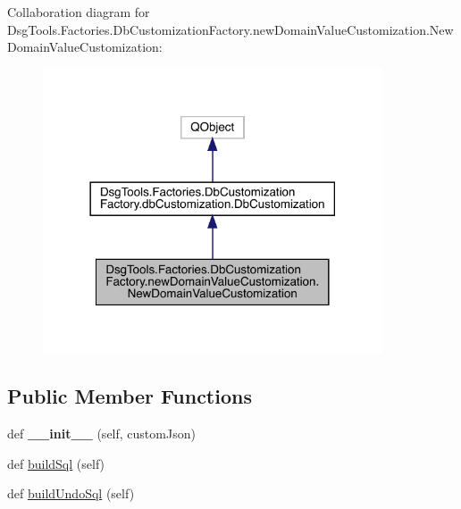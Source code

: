 Collaboration diagram for Dsg\+Tools.\+Factories.\+Db\+Customization\+Factory.\+new\+Domain\+Value\+Customization.\+New\+Domain\+Value\+Customization\+:
\nopagebreak
\begin{figure}[H]
\begin{center}
\leavevmode
\includegraphics[width=285pt]{class_dsg_tools_1_1_factories_1_1_db_customization_factory_1_1new_domain_value_customization_1_11c7d026d7771cc75623b1b75b38df637}
\end{center}
\end{figure}
\subsection*{Public Member Functions}
\begin{DoxyCompactItemize}
\item 
\mbox{\label{class_dsg_tools_1_1_factories_1_1_db_customization_factory_1_1new_domain_value_customization_1_1_new_domain_value_customization_a11a636a7aed0bdadf8cedd670a32d40c}} 
def {\bfseries \+\_\+\+\_\+init\+\_\+\+\_\+} (self, custom\+Json)
\item 
def \mbox{\hyperlink{class_dsg_tools_1_1_factories_1_1_db_customization_factory_1_1new_domain_value_customization_1_1_new_domain_value_customization_af79a4036bec44749937d6a2e22909f9e}{build\+Sql}} (self)
\item 
def \mbox{\hyperlink{class_dsg_tools_1_1_factories_1_1_db_customization_factory_1_1new_domain_value_customization_1_1_new_domain_value_customization_a690871b5af633c2074c050ba747d240b}{build\+Undo\+Sql}} (self)
\end{DoxyCompactItemize}
